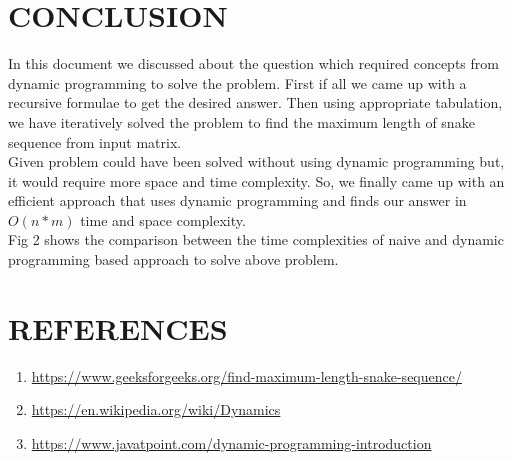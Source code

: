 \documentclass[conference]{IEEEtran}
\begin{document}
\section{CONCLUSION}
In this document we discussed about the question which
required concepts from dynamic programming to solve the
problem. First if all we came up with a recursive formulae
to get the desired answer. Then using appropriate tabulation,
we have iteratively solved the problem to find the maximum
length of snake sequence from input matrix.\\
Given problem could have been solved without using dynamic programming but, it would require more space and
time complexity. So, we finally came up with an efficient
approach that uses dynamic programming and finds our answer
in $O(n*m)$ time and space complexity.\\
Fig 2 shows the comparison between the time complexities
of naive and dynamic programming based approach to solve
above problem.


\section{REFERENCES}
\begin{enumerate}
    \item \url{https://www.geeksforgeeks.org/find-maximum-length-snake-sequence/}
    \item \url{https://en.wikipedia.org/wiki/Dynamics}
     \item \url{https://www.javatpoint.com/dynamic-programming-introduction}
\end{enumerate}
\end{document}
